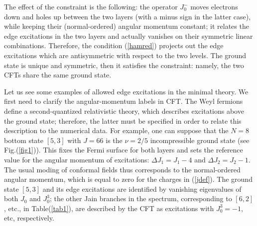 The effect of the constraint is the following:
the operator $J^-_0$ moves electrons down and holes up 
between the two layers (with a minus sign in the latter case),
while keeping their (normal-ordered) angular momentum constant;
it relates the edge excitations in the two layers and actually vanishes
on their symmetric linear combinations.
Therefore, the condition (\ref{hamred}) projects out the edge excitations
which are antisymmetric with respect to the two levels.
The ground state is unique and symmetric, then it satisfies 
the constraint: namely, the two CFTs share the same ground state. 

Let us see some examples of allowed edge excitations in the minimal theory.
We first need to clarify the angular-momentum labels in CFT.
The Weyl fermions define a second-quantized relativistic
theory, which describes excitations above the
ground state; therefore, the latter must be specified in order to
relate this description to the numerical data. For example, one
can suppose that the $N=8$ bottom state $[5,3]$ with $J=66$ 
is the $\nu=2/5$ incompressible ground state (see Fig.(\ref{fig1})). 
This fixes the Fermi surface for both layers and sets the reference value for 
the angular momentum of excitations: $\Delta J_1=J_1-4$ and 
$\Delta J_2=J_2-1$. 
The usual moding of conformal fields thus corresponds
to the normal-ordered angular momentum,
which is equal to zero for the charges in (\ref{jdef}). 
The ground state $[5,3]$ and its edge excitations 
are identified by vanishing eigenvalues
of both $J_0$ and $J_0^3$; the other Jain branches in the
spectrum, corresponding to $[6,2]$, etc., in Table(\ref{tab1}),
are described by the CFT as excitations with $J_0^3=-1$, etc,
respectively.

